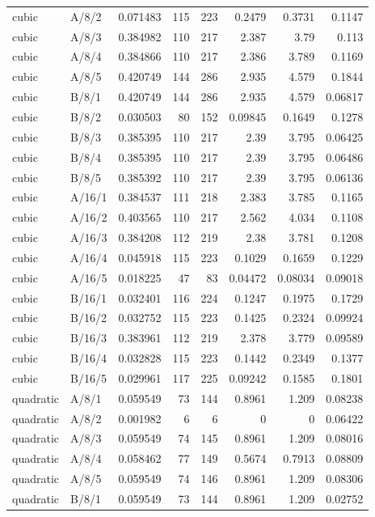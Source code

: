 \begin{longtable}{llrrrrrr}
cubic & A/8/2 & 0.071483 & 115 & 223 & 0.2479 & 0.3731 & 0.1147 \\
cubic & A/8/3 & 0.384982 & 110 & 217 & 2.387 & 3.79 & 0.113 \\
cubic & A/8/4 & 0.384866 & 110 & 217 & 2.386 & 3.789 & 0.1169 \\
cubic & A/8/5 & 0.420749 & 144 & 286 & 2.935 & 4.579 & 0.1844 \\
cubic & B/8/1 & 0.420749 & 144 & 286 & 2.935 & 4.579 & 0.06817 \\
cubic & B/8/2 & 0.030503 & 80 & 152 & 0.09845 & 0.1649 & 0.1278 \\
cubic & B/8/3 & 0.385395 & 110 & 217 & 2.39 & 3.795 & 0.06425 \\
cubic & B/8/4 & 0.385395 & 110 & 217 & 2.39 & 3.795 & 0.06486 \\
cubic & B/8/5 & 0.385392 & 110 & 217 & 2.39 & 3.795 & 0.06136 \\
cubic & A/16/1 & 0.384537 & 111 & 218 & 2.383 & 3.785 & 0.1165 \\
cubic & A/16/2 & 0.403565 & 110 & 217 & 2.562 & 4.034 & 0.1108 \\
cubic & A/16/3 & 0.384208 & 112 & 219 & 2.38 & 3.781 & 0.1208 \\
cubic & A/16/4 & 0.045918 & 115 & 223 & 0.1029 & 0.1659 & 0.1229 \\
cubic & A/16/5 & 0.018225 & 47 & 83 & 0.04472 & 0.08034 & 0.09018 \\
cubic & B/16/1 & 0.032401 & 116 & 224 & 0.1247 & 0.1975 & 0.1729 \\
cubic & B/16/2 & 0.032752 & 115 & 223 & 0.1425 & 0.2324 & 0.09924 \\
cubic & B/16/3 & 0.383961 & 112 & 219 & 2.378 & 3.779 & 0.09589 \\
cubic & B/16/4 & 0.032828 & 115 & 223 & 0.1442 & 0.2349 & 0.1377 \\
cubic & B/16/5 & 0.029961 & 117 & 225 & 0.09242 & 0.1585 & 0.1801 \\
quadratic & A/8/1 & 0.059549 & 73 & 144 & 0.8961 & 1.209 & 0.08238 \\
quadratic & A/8/2 & 0.001982 & 6 & 6 & 0 & 0 & 0.06422 \\
quadratic & A/8/3 & 0.059549 & 74 & 145 & 0.8961 & 1.209 & 0.08016 \\
quadratic & A/8/4 & 0.058462 & 77 & 149 & 0.5674 & 0.7913 & 0.08809 \\
quadratic & A/8/5 & 0.059549 & 74 & 146 & 0.8961 & 1.209 & 0.08306 \\
quadratic & B/8/1 & 0.059549 & 73 & 144 & 0.8961 & 1.209 & 0.02752 \\

\end{longtable}
